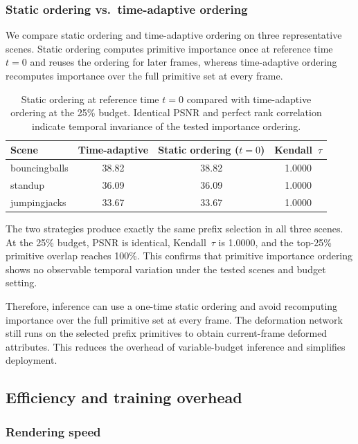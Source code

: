 \documentclass[pdflatex,sn-mathphys]{sn-jnl}
\begin{document}
\subsubsection{Static ordering vs.\ time-adaptive ordering}

We compare static ordering and time-adaptive ordering on three representative scenes. Static ordering computes primitive importance once at reference time $t=0$ and reuses the ordering for later frames, whereas time-adaptive ordering recomputes importance over the full primitive set at every frame.

\begin{table}[!htbp]
\caption{Static ordering at reference time $t=0$ compared with time-adaptive ordering at the 25\% budget. Identical PSNR and perfect rank correlation indicate temporal invariance of the tested importance ordering.}
\label{tab:static_ordering}
\centering
\small
\setlength{\tabcolsep}{5pt}
\begin{tabular}{lccc}
\toprule
Scene & Time-adaptive & Static ordering ($t=0$) & Kendall~$\tau$ \\
\midrule
bouncingballs & 38.82 & 38.82 & 1.0000 \\
standup       & 36.09 & 36.09 & 1.0000 \\
jumpingjacks  & 33.67 & 33.67 & 1.0000 \\
\bottomrule
\end{tabular}
\end{table}

The two strategies produce exactly the same prefix selection in all three scenes. At the 25\% budget, PSNR is identical, Kendall~$\tau$ is 1.0000, and the top-25\% primitive overlap reaches 100\%. This confirms that primitive importance ordering shows no observable temporal variation under the tested scenes and budget setting.

Therefore, inference can use a one-time static ordering and avoid recomputing importance over the full primitive set at every frame. The deformation network still runs on the selected prefix primitives to obtain current-frame deformed attributes. This reduces the overhead of variable-budget inference and simplifies deployment.

\subsection{Efficiency and training overhead}
\label{sec:efficiency}

\subsubsection{Rendering speed}
\end{document}
